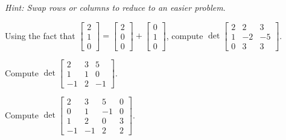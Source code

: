 \begin{applicationActivities}{2}{26}
\begin{activity}{5}
  {\em Hint: Swap rows or columns to reduce to an easier problem}.
\end{activity}

\begin{activity}{10}
   Using the fact that $\begin{bmatrix} 2 \\ 1 \\ 0 \end{bmatrix} = \begin{bmatrix} 2 \\ 0 \\ 0 \end{bmatrix} + \begin{bmatrix} 0 \\ 1 \\ 0 \end{bmatrix}$, compute $\det \begin{bmatrix} 2 & 2 & 3 \\ 1 & -2 & -5 \\ 0 & 3 & 3 \end{bmatrix}$.
\end{activity}

\begin{activity}{10}
   Compute $\det \begin{bmatrix} 2 & 3 & 5  \\ 1 & 1 & 0  \\ -1 & 2 & -1 \end{bmatrix}$.
\end{activity}

\begin{activity}{10}
   Compute $\det \begin{bmatrix} 2 & 3 & 5 & 0 \\ 0 & 1 & -1 & 0 \\ 1 & 2 & 0 & 3 \\ -1 & -1 & 2 & 2 \end{bmatrix}$.
\end{activity}

\end{applicationActivities}
